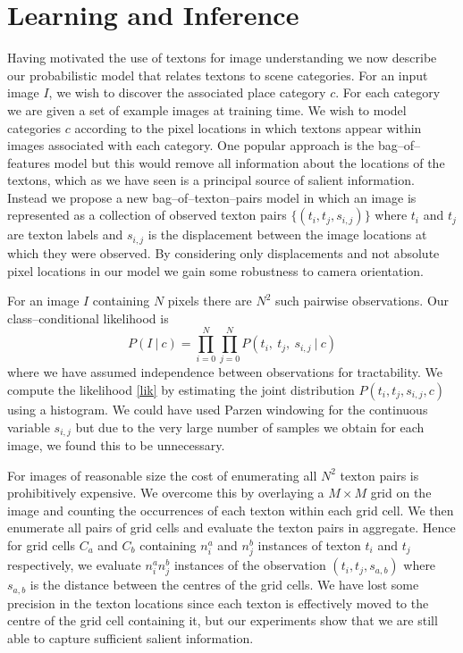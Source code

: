 \section{Learning and Inference}
\label{sec:approach}
Having motivated the use of textons for image understanding we now
describe our probabilistic model that relates textons to scene
categories. For an input image $I$, we wish to discover the associated
place category $c$. For each category we are given a set of example
images at training time. We wish to model categories $c$ according
to the pixel locations in which textons appear within images
associated with each category. One popular approach is the
bag--of--features model \cite{Jebara03} but this would remove all
information about the locations of the textons, which as we have seen
is a principal source of salient information. Instead we propose a new
bag--of--texton--pairs model in which an image is represented as a
collection of observed texton pairs $\{(t_i, t_j, s_{i,j})\}$ where
$t_i$ and $t_j$ are texton labels and $s_{i,j}$ is the displacement
between the image locations at which they were observed. By
considering only displacements and not absolute pixel locations in our
model we gain some robustness to camera orientation.

For an image $I$ containing $N$ pixels there are $N^2$ such
pairwise observations. Our class--conditional likelihood is
\begin{equation}
P(I ~|~ c) = \prod_{i=0}^N \prod_{j=0}^N
P(t_i, ~ t_j, ~ s_{i,j} ~|~ c) \label{lik}
\end{equation}
where we have assumed independence between observations for
tractability. We compute the likelihood \eqref{lik} by estimating the
joint distribution $P(t_i,t_j,s_{i,j},c)$ using a histogram. We could
have used Parzen windowing \cite{Parzen62} for the continuous variable
$s_{i,j}$ but due to the very large number of samples we obtain for
each image, we found this to be unnecessary.

For images of reasonable size the cost of enumerating all $N^2$ texton
pairs is prohibitively expensive. We overcome this by overlaying a $M
\times M$ grid on the image and counting the occurrences of each
texton within each grid cell. We then enumerate all pairs of grid
cells and evaluate the texton pairs in aggregate. Hence for grid cells
$C_a$ and $C_b$ containing $n^a_i$ and $n^b_j$ instances of texton $t_i$
and $t_j$ respectively, we evaluate $n^a_i n^b_j$ instances of the
observation $(t_i,t_j,s_{a,b})$ where $s_{a,b}$ is the
distance between the centres of the grid cells. We have lost some
precision in the texton locations since each texton is effectively
moved to the centre of the grid cell containing it, but our
experiments show that we are still able to capture sufficient salient
information.

